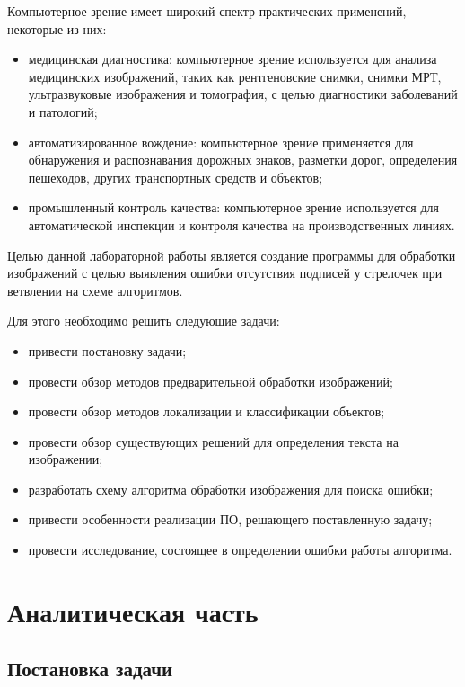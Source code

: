 \documentclass[12pt]{report}
\begin{document}
Компьютерное зрение имеет широкий спектр практических применений, некоторые из них:
\begin{itemize}
    \item медицинская диагностика: компьютерное зрение используется для анализа медицинских изображений, таких как рентгеновские снимки, снимки МРТ, ультразвуковые изображения и томография, с целью диагностики заболеваний и патологий;
    \item автоматизированное вождение: компьютерное зрение применяется для обнаружения и распознавания дорожных знаков, разметки дорог, определения пешеходов, других транспортных средств и объектов;
    \item промышленный контроль качества: компьютерное зрение используется для автоматической инспекции и контроля качества на производственных линиях.
\end{itemize}

Целью данной лабораторной работы является создание программы для обработки изображений с целью выявления ошибки отсутствия подписей у стрелочек при ветвлении на схеме алгоритмов.

Для этого необходимо решить следующие задачи:
\begin{itemize}
    \item привести постановку задачи;
    \item провести обзор методов предварительной обработки изображений;
    \item провести обзор методов локализации и классификации объектов;
    \item провести обзор существующих решений для определения текста на изображении;
    \item разработать схему алгоритма обработки изображения для поиска ошибки;
    \item привести особенности реализации ПО, решающего поставленную задачу;
    \item провести исследование, состоящее в определении ошибки работы алгоритма.
\end{itemize}

\chapter{Аналитическая часть}

\section{Постановка задачи} 
\end{document}

